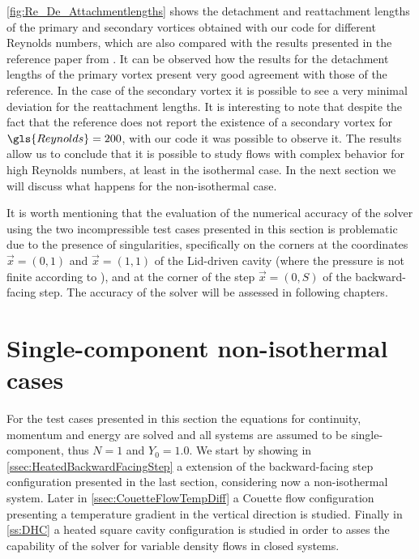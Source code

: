\cref{fig:Re_De_Attachmentlengths} shows the detachment and reattachment lengths of the primary and secondary vortices obtained with our code for different Reynolds numbers, which are also compared with the results presented in the reference paper from \cite{biswasBackwardFacingStepFlows2004}. It can be observed how the results for the detachment lengths of the primary vortex present very good agreement with those of the reference. In the case of the secondary vortex it is possible to see a very minimal deviation for the reattachment lengths. It is interesting to note that despite the fact that the reference does not report the existence of a secondary vortex for $\gls{Reynolds} = 200$, with our code it was possible to observe it. The results allow us to conclude that it is possible to study flows with complex behavior for high Reynolds numbers, at least in the isothermal case. In the next section we will discuss what happens for the non-isothermal case.


It is worth mentioning that the evaluation of the numerical accuracy of the solver using the two incompressible test cases presented in this section is problematic due to the presence of singularities, specifically on the corners at the coordinates $ \vec{x} = (0,1)$ and $\vec{x} =(1,1)$ of the Lid-driven cavity (where the pressure is not finite according to \cite{botellaBenchmarkSpectralResults1998}), and at the corner of the step $\vec{x} = (0,S)$ of the backward-facing step. The accuracy of the solver will be assessed in following chapters. 

\section{Single-component non-isothermal cases} \label{sec:SinCompNonIsothermCase}
For the test cases presented in this section the equations for continuity, momentum and energy are solved and all systems are assumed to be single-component, thus $N = 1$ and $Y_0 = 1.0$. We start by showing in \cref{ssec:HeatedBackwardFacingStep} a extension of the backward-facing step configuration presented in the last section, considering now a non-isothermal system. Later in \cref{ssec:CouetteFlowTempDiff} a Couette flow configuration presenting a temperature gradient in the vertical direction is studied. Finally in \cref{ss:DHC} a heated square cavity configuration is studied in order to asses the capability of the solver for variable density flows in closed systems. 


